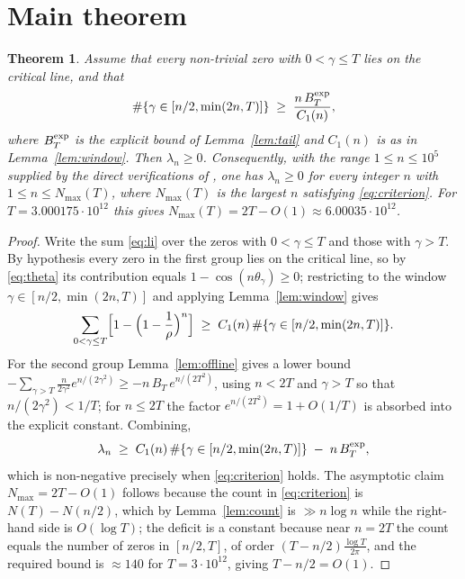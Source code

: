 \documentclass[11pt]{article}
\newtheorem{theorem}{Theorem}
\theoremstyle{remark}
\begin{document}
\section{Main theorem}
\begin{theorem}\label{thm:main}
Assume that every non-trivial zero with $0<\gamma\le T$ lies on the critical line, and that
\begin{equation}\label{eq:criterion}
  \#\{\gamma\in[n/2,\min(2n,T)]\}\;\ge\;\frac{n\,B_T^{\rm exp}}{C_1(n)},
\end{equation}
where $B_T^{\rm exp}$ is the explicit bound of Lemma~\ref{lem:tail} and $C_1(n)$ is as in
Lemma~\ref{lem:window}. Then $\lambda_n\ge0$. Consequently, with the range $1\le n\le10^{5}$
supplied by the direct verifications of \cite{Keiper,Coffey}, one has
$\lambda_n\ge0$ for every integer $n$ with $1\le n\le N_{\max}(T)$, where $N_{\max}(T)$ is the
largest $n$ satisfying \eqref{eq:criterion}.
For $T=3.000175\cdot10^{12}$ this gives $N_{\max}(T)=2T-O(1)\approx6.00035\cdot10^{12}$.
\end{theorem}
\begin{proof}
Write the sum \eqref{eq:li} over the zeros with $0<\gamma\le T$ and those with $\gamma>T$.
By hypothesis every zero in the first group lies on the critical line, so by
\eqref{eq:theta} its contribution equals $1-\cos(n\theta_\gamma)\ge0$; restricting to the window
$\gamma\in[n/2,\min(2n,T)]$ and applying Lemma~\ref{lem:window} gives
\[
  \sum_{0<\gamma\le T}\Bigl[1-\Bigl(1-\frac1\rho\Bigr)^{n}\Bigr]
  \;\ge\;C_1(n)\,\#\{\gamma\in[n/2,\min(2n,T)]\}.
\]
For the second group Lemma~\ref{lem:offline} gives a lower bound
$-\sum_{\gamma>T}\frac{n}{2\gamma^{2}}e^{n/(2\gamma^{2})}
\ge-n\,B_T\,e^{n/(2T^{2})}$, using $n<2T$ and $\gamma>T$ so that $n/(2\gamma^{2})<1/T$; for
$n\le 2T$ the factor $e^{n/(2T^{2})}=1+O(1/T)$ is absorbed into the explicit constant. Combining,
\[
  \lambda_n\;\ge\;C_1(n)\,\#\{\gamma\in[n/2,\min(2n,T)]\}\;-\;n\,B_T^{\rm exp},
\]
which is non-negative precisely when \eqref{eq:criterion} holds. The asymptotic claim
$N_{\max}=2T-O(1)$ follows because the count in \eqref{eq:criterion} is
$N(T)-N(n/2)$, which by Lemma~\ref{lem:count} is $\gg n\log n$ while the right-hand side is
$O(\log T)$; the deficit is a constant because near $n=2T$ the count equals the number of zeros
in $[n/2,T]$, of order $(T-n/2)\frac{\log T}{2\pi}$, and the required bound is $\approx140$ for
$T=3\cdot10^{12}$, giving $T-n/2=O(1)$.
\end{proof}
\end{document}
